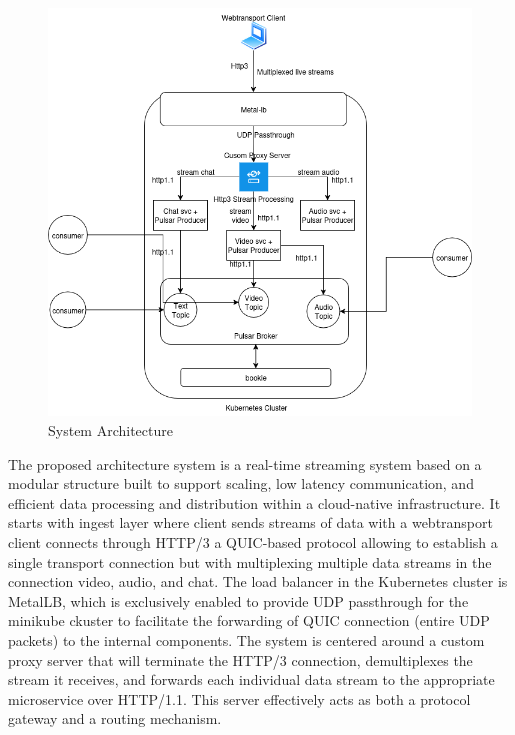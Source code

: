 {\begin{figure}[H]
\caption{System Architecture}
\centering
\includegraphics[width=1\textwidth]{Design/Design_Solution.png}
\end{figure}

The proposed architecture system is a real-time streaming system based on a modular structure built to support scaling, low latency communication, and efficient data processing and distribution within a cloud-native infrastructure. It starts with ingest layer where client sends streams of data with a webtransport client connects through HTTP/3 a QUIC-based protocol allowing to establish a single transport connection but with multiplexing multiple data streams in the connection video, audio, and chat. The load balancer in the Kubernetes cluster is MetalLB, which is exclusively enabled to provide UDP passthrough for the minikube ckuster to facilitate the forwarding of QUIC connection (entire UDP packets) to the internal components. The system is centered around a custom proxy server that will terminate the HTTP/3 connection, demultiplexes the stream it receives, and forwards each individual data stream to the appropriate microservice over HTTP/1.1. This server effectively acts as both a protocol gateway and a routing mechanism.

}
